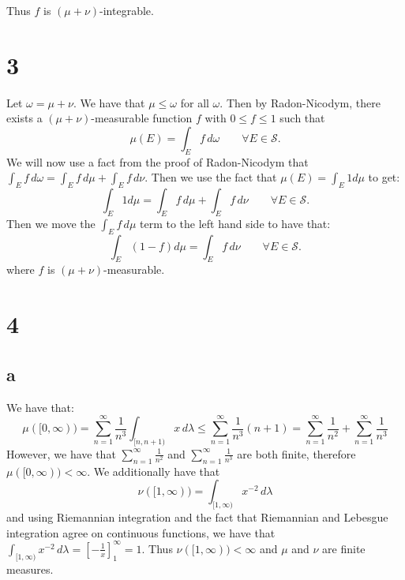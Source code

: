 \documentclass{article}
\theoremstyle{definition}
\numberwithin{theorem}{section}
\numberwithin{equation}{section}
\begin{document}
Thus $f$ is $(\mu + \nu)$-integrable. 

\section{3}
Let $\omega = \mu + \nu$. We have that $\mu \leq \omega$ for all $\omega$. Then by Radon-Nicodym, there exists a $(\mu + \nu)$-measurable function $f$ with $0 \leq f \leq 1$ such that
\begin{equation}
	\mu(E) = \int_E f \, d\omega \qquad \forall E \in \mathcal{S}.
\end{equation} 
We will now use a fact from the proof of Radon-Nicodym that $\int_E f \, d\omega = \int_E f \, d\mu +  \int_E f \, d\nu$. Then we use the fact that $\mu(E) = \int_E 1 d\mu$ to get:
\begin{equation}
	\int_E 1 d\mu = \int_E f \, d\mu +  \int_E f \, d\nu \qquad \forall E \in \mathcal{S}.
\end{equation}
Then we move the $\int_E f \, d\mu$ term to the left hand side to have that:
\begin{equation}
	\int_E \left(1 - f\right) d\mu = \int_E f \, d\nu \qquad \forall E \in \mathcal{S}.
\end{equation}
where $f$ is $(\mu + \nu)$-measurable. 
\section{4}

\subsection{a}
We have that:
\begin{equation}
	\mu([0, \infty)) = \sum_{n = 1}^{\infty} \frac{1}{n^3} \int_{[n, n + 1)} x \, d\lambda \leq \sum_{n = 1}^{\infty} \frac{1}{n^3} (n + 1) = \sum_{n = 1}^{\infty} \frac{1}{n^2} + \sum_{n = 1}^{\infty} \frac{1}{n^3}
\end{equation}
However, we have that $\sum_{n = 1}^{\infty} \frac{1}{n^2}$ and $\sum_{n = 1}^{\infty} \frac{1}{n^3}$ are both finite, therefore $\mu([0, \infty)) < \infty$. 
We additionally have that
\begin{equation}
	\nu([1, \infty)) = \int_{[1, \infty)} x^{-2} \, d\lambda
\end{equation}
and using Riemannian integration and the fact that Riemannian and Lebesgue integration agree on continuous functions, we have that $\int_{[1, \infty)} x^{-2} \, d\lambda = \left[ -\frac{1}{x} \right]^\infty_{1} = 1$. Thus $\nu([1, \infty)) < \infty$ and $\mu$ and $\nu$ are finite measures. 
\end{document}
